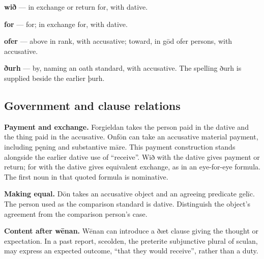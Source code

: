 \textbf{wið} — in exchange or return for, with dative.

\textbf{for} — for; in exchange for, with dative.

\textbf{ofer} — above in rank, with accusative; toward, in gōd ofer persons, with accusative.

\textbf{ðurh} — by, naming an oath standard, with accusative. The spelling ðurh is supplied beside the earlier þurh.

\subsection*{Government and clause relations}

\textbf{Payment and exchange.} Forgieldan takes the person paid in the dative and the thing paid in the accusative. Onfōn can take an accusative material payment, including pęning and substantive māre. This payment construction stands alongside the earlier dative use of “receive”. Wið with the dative gives payment or return; for with the dative gives equivalent exchange, as in an eye-for-eye formula. The first noun in that quoted formula is nominative.

\textbf{Making equal.} Dōn takes an accusative object and an agreeing predicate gelīc. The person used as the comparison standard is dative. Distinguish the object’s agreement from the comparison person’s case.

\textbf{Content after wēnan.} Wēnan can introduce a ðæt clause giving the thought or expectation. In a past report, sceolden, the preterite subjunctive plural of sculan, may express an expected outcome, “that they would receive”, rather than a duty.

